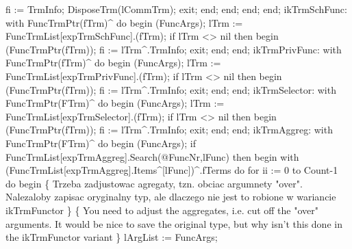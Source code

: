                              fi := TrmInfo;
                             DisposeTrm(lCommTrm);
                             exit;
                          end;
                       end;
                 end;
           end;
        ikTrmSchFunc:
           with FuncTrmPtr(fTrm)^ do
           begin
              (FuncArgs);
              lTrm := FuncTrmList[expTrmSchFunc].(fTrm);
              if lTrm <> nil then
              begin
                 (FuncTrmPtr(fTrm));
                 fi := lTrm^.TrmInfo;
                 exit;
              end;
           end;
        ikTrmPrivFunc:
           with FuncTrmPtr(fTrm)^ do
           begin
              (FuncArgs);
              lTrm := FuncTrmList[expTrmPrivFunc].(fTrm);
              if lTrm <> nil then
              begin
                 (FuncTrmPtr(fTrm));
                 fi := lTrm^.TrmInfo;
                 exit;
              end;
           end;
        ikTrmSelector:
           with FuncTrmPtr(FTrm)^ do
           begin
              (FuncArgs);
              lTrm := FuncTrmList[expTrmSelector].(fTrm);
              if lTrm <> nil then
              begin
                 (FuncTrmPtr(fTrm));
                 fi := lTrm^.TrmInfo;
                 exit;
              end;
           end;
        ikTrmAggreg:
           with FuncTrmPtr(FTrm)^ do
           begin
              (FuncArgs);
              if FuncTrmList[expTrmAggreg].Search(@FuncNr,lFunc) then
              begin
                 with (FuncTrmList[expTrmAggreg].Items^[lFunc])^.fTerms do
                    for ii := 0 to Count-1 do
                    begin
                       \{ Trzeba zadjustowac agregaty, tzn. obciac argumnety "over".
                       Nalezaloby zapisac oryginalny typ, ale dlaczego nie jest
                       to robione w wariancie ikTrmFunctor
                       \}
                       \{ You need to adjust the aggregates, i.e. cut off the "over" arguments.
                       It would be nice to save the original type, but why isn't this done in the ikTrmFunctor variant \}
                       lArgList := FuncArgs;
